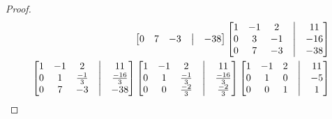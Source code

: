 \documentclass[12pt]{article}
\begin{document}
\begin{enumerate}
\begin{enumerate}
\begin{proof}
\begin{align*}
\begin{bmatrix}
                                                    0 & 7  & -3 & \bigm| & -38 \\
                                            \end{bmatrix}
                                            \begin{bmatrix}
                                                    1 & -1 & 2  & \bigm| & 11  \\
                                                    0 & 3  & -1 & \bigm| & -16 \\
                                                    0 & 7  & -3 & \bigm| & -38 \\
                                            \end{bmatrix}
                                             &
                                            \\
                                            \begin{bmatrix}
                                                    1 & -1 & 2            & \bigm| & 11            \\
                                                    0 & 1  & \frac{-1}{3} & \bigm| & \frac{-16}{3} \\
                                                    0 & 7  & -3           & \bigm| & -38           \\
                                            \end{bmatrix}
                                            \begin{bmatrix}
                                                    1 & -1 & 2            & \bigm| & 11            \\
                                                    0 & 1  & \frac{-1}{3} & \bigm| & \frac{-16}{3} \\
                                                    0 & 0  & \frac{-2}{3} & \bigm| & \frac{-2}{3}  \\
                                            \end{bmatrix}
                                            \begin{bmatrix}
                                                    1 & -1 & 2 & \bigm| & 11 \\
                                                    0 & 1  & 0 & \bigm| & -5 \\
                                                    0 & 0  & 1 & \bigm| & 1  \\

\end{bmatrix}
\end{align*}
\end{proof}
\end{enumerate}
\end{enumerate}
\end{document}
